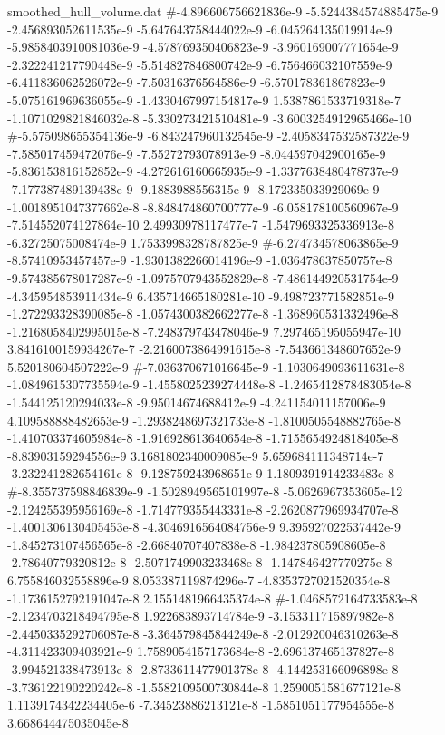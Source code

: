 \begin{filecontents}{smoothed_hull_volume.dat}
#-4.896606756621836e-9	-5.5244384574885475e-9	-2.456893052611535e-9	-5.647643758444022e-9	-6.045264135019914e-9	-5.9858403910081036e-9	-4.578769350406823e-9	-3.960169007771654e-9	-2.322241217790448e-9	-5.514827846800742e-9	-6.756466032107559e-9	-6.411836062526072e-9	-7.50316376564586e-9	-6.570178361867823e-9	-5.075161969636055e-9	-1.4330467997154817e-9	1.5387861533719318e-7	-1.1071029821846032e-8	-5.330273421510481e-9	-3.6003254912965466e-10
#-5.575098655354136e-9	-6.843247960132545e-9	-2.4058347532587322e-9	-7.585017459472076e-9	-7.55272793078913e-9	-8.044597042900165e-9	-5.836153816152852e-9	-4.272616160665935e-9	-1.3377638480478737e-9	-7.177387489139438e-9	-9.1883988556315e-9	-8.172335033929069e-9	-1.0018951047377662e-8	-8.848474860700777e-9	-6.058178100560967e-9	-7.514552074127864e-10	2.49930978117477e-7	-1.5479693325336913e-8	-6.32725075008474e-9	1.7533998328787825e-9
#-6.274734578063865e-9	-8.57410953457457e-9	-1.9301382266014196e-9	-1.036478637850757e-8	-9.574385678017287e-9	-1.0975707943552829e-8	-7.486144920531754e-9	-4.345954853911434e-9	6.435714665180281e-10	-9.498723771582851e-9	-1.272293328390085e-8	-1.0574300382662277e-8	-1.368960531332496e-8	-1.2168058402995015e-8	-7.248379743478046e-9	7.297465195055947e-10	3.8416100159934267e-7	-2.2160073864991615e-8	-7.543661348607652e-9	5.520180604507222e-9
#-7.036370671016645e-9	-1.1030649093611631e-8	-1.0849615307735594e-9	-1.4558025239274448e-8	-1.2465412878483054e-8	-1.544125120294033e-8	-9.95014674688412e-9	-4.241154011157006e-9	4.109588888482653e-9	-1.2938248697321733e-8	-1.8100505548882765e-8	-1.410703374605984e-8	-1.916928613640654e-8	-1.7155654924818405e-8	-8.83903159294556e-9	3.1681802340009085e-9	5.659684111348714e-7	-3.232241282654161e-8	-9.128759243968651e-9	1.1809391914233483e-8
#-8.355737598846839e-9	-1.5028949565101997e-8	-5.0626967353605e-12	-2.124255395956169e-8	-1.714779355443331e-8	-2.2620877969934707e-8	-1.4001306130405453e-8	-4.3046916564084756e-9	9.395927022537442e-9	-1.845273107456565e-8	-2.66840707407838e-8	-1.984237805908605e-8	-2.78640779320812e-8	-2.5071749903233468e-8	-1.147846427770275e-8	6.755846032558896e-9	8.053387119874296e-7	-4.8353727021520354e-8	-1.1736152792191047e-8	2.1551481966435374e-8
#-1.0468572164733583e-8	-2.1234703218494795e-8	1.922683893714784e-9	-3.153311715897982e-8	-2.4450335292706087e-8	-3.364579845844249e-8	-2.012920046310263e-8	-4.311423309403921e-9	1.7589054157173684e-8	-2.696137465137827e-8	-3.994521338473913e-8	-2.8733611477901378e-8	-4.144253166096898e-8	-3.736122190220242e-8	-1.5582109500730844e-8	1.2590051581677121e-8	1.1139174342234405e-6	-7.34523886213121e-8	-1.5851051177954555e-8	3.668644475035045e-8

\end{filecontents}
